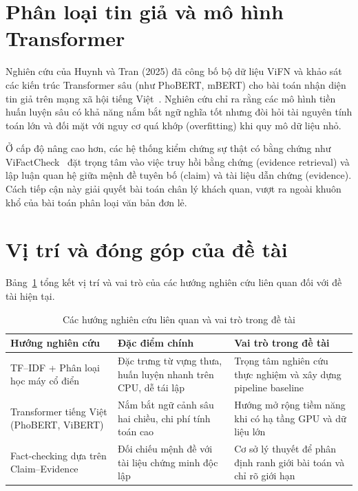 \documentclass[12pt,a4paper]{report}
\begin{document}
\section{Phân loại tin giả và mô hình Transformer}
Nghiên cứu của Huynh và Tran (2025) đã công bố bộ dữ liệu ViFN và khảo sát các kiến trúc Transformer sâu (như PhoBERT, mBERT) cho bài toán nhận diện tin giả trên mạng xã hội tiếng Việt~\cite{huynh2025utilizing}. Nghiên cứu chỉ ra rằng các mô hình tiền huấn luyện sâu có khả năng nắm bắt ngữ nghĩa tốt nhưng đòi hỏi tài nguyên tính toán lớn và đối mặt với nguy cơ quá khớp (overfitting) khi quy mô dữ liệu nhỏ.

Ở cấp độ nâng cao hơn, các hệ thống kiểm chứng sự thật có bằng chứng như ViFactCheck~\cite{tran2025vifactcheck} đặt trọng tâm vào việc truy hồi bằng chứng (evidence retrieval) và lập luận quan hệ giữa mệnh đề tuyên bố (claim) và tài liệu dẫn chứng (evidence). Cách tiếp cận này giải quyết bài toán chân lý khách quan, vượt ra ngoài khuôn khổ của bài toán phân loại văn bản đơn lẻ.

\section{Vị trí và đóng góp của đề tài}
Bảng~\ref{tab:lienquan} tổng kết vị trí và vai trò của các hướng nghiên cứu liên quan đối với đề tài hiện tại.

\begin{table}[H]
\centering
\caption{Các hướng nghiên cứu liên quan và vai trò trong đề tài}
\label{tab:lienquan}
\begin{tabularx}{\textwidth}{p{3.8cm} X p{4.5cm}}
\toprule
\textbf{Hướng nghiên cứu} & \textbf{Đặc điểm chính} & \textbf{Vai trò trong đề tài} \\
\midrule
TF--IDF + Phân loại học máy cổ điển & Đặc trưng từ vựng thưa, huấn luyện nhanh trên CPU, dễ tái lập & Trọng tâm nghiên cứu thực nghiệm và xây dựng pipeline baseline \\
\addlinespace
Transformer tiếng Việt (PhoBERT, ViBERT) & Nắm bắt ngữ cảnh sâu hai chiều, chi phí tính toán cao & Hướng mở rộng tiềm năng khi có hạ tầng GPU và dữ liệu lớn \\
\addlinespace
Fact-checking dựa trên Claim--Evidence & Đối chiếu mệnh đề với tài liệu chứng minh độc lập & Cơ sở lý thuyết để phân định ranh giới bài toán và chỉ rõ giới hạn \\
\bottomrule
\end{tabularx}
\end{table}
\end{document}
